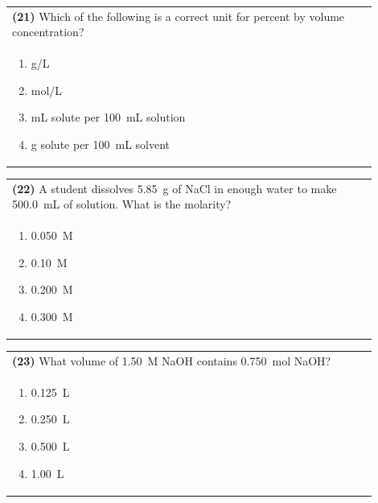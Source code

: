 \documentclass{article}
\begin{document}
\noindent\begin{tabular}{|p{0.9\linewidth}|}
\hline
\textbf{(21)} Which of the following is a correct unit for percent by volume concentration?\\[0.2cm]
\begin{minipage}[t]{0.85\linewidth}
\begin{enumerate}[label=\alph*.]
\item g/L
\item mol/L
\item mL solute per 100~mL solution
\item g solute per 100~mL solvent
\end{enumerate}
\end{minipage}\\[0.2cm]
\hline
\end{tabular}

\noindent\begin{tabular}{|p{0.9\linewidth}|}
\hline
\textbf{(22)} A student dissolves 5.85~g of NaCl in enough water to make 500.0~mL of solution. What is the molarity? \\[0.2cm]
\begin{minipage}[t]{0.85\linewidth}
\begin{enumerate}[label=\alph*.]
\item 0.050~M
\item 0.10~M
\item 0.200~M
\item 0.300~M
\end{enumerate}
\end{minipage}\\[0.2cm]
\hline
\end{tabular}

\noindent\begin{tabular}{|p{0.9\linewidth}|}
\hline
\textbf{(23)} What volume of 1.50~M NaOH contains 0.750~mol NaOH?\\[0.2cm]
\begin{minipage}[t]{0.85\linewidth}
\begin{enumerate}[label=\alph*.]
\item 0.125~L
\item 0.250~L
\item 0.500~L
\item 1.00~L
\end{enumerate}
\end{minipage}\\[0.2cm]
\hline
\end{tabular}
\end{document}
